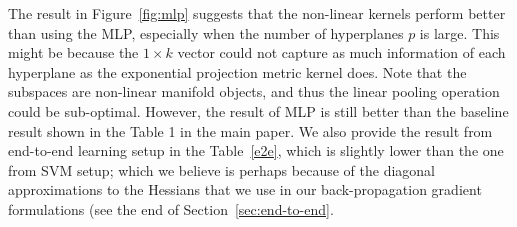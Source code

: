 \documentclass[runningheads]{llncs}
\begin{document}
The result in Figure~\ref{fig:mlp} suggests that the non-linear kernels perform better than using the MLP, especially when the number of hyperplanes $p$ is large. This might be because the $1 \times k$ vector could not capture as much information of each hyperplane as the exponential projection metric kernel does. Note that the subspaces are non-linear manifold objects, and thus the linear pooling operation could be sub-optimal. However, the result of MLP is still better than the baseline result shown in the Table 1 in the main paper. We also provide the result from end-to-end learning setup in the Table~\ref{e2e}, which is slightly lower than the one from SVM setup; which we believe is perhaps because of the diagonal approximations to the Hessians that we use in our back-propagation gradient formulations (see the end of Section~\ref{sec:end-to-end}.
\end{document}

